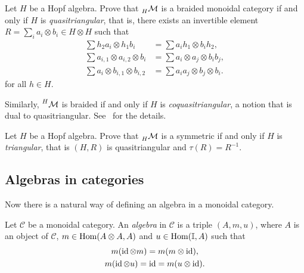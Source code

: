 \documentclass[12pt]{amsproc}
\newcommand{\ydH}{\prescript{H}{H}{\mathcal{YD}}}
\newcommand{\lmod}[1]{\prescript{}{#1}{\mathcal{M}}}
\newcommand{\lcomod}[1]{\prescript{#1}{}{\mathcal{M}}}
\begin{document}

\begin{exercise}
\label{xca:QT}
    Let $H$ be a Hopf algebra. Prove that 
    $\lmod{H}$ is a braided
    monoidal category if and only if $H$ is \emph{quasitriangular}, that is, there exists an invertible element
    $R=\sum_{i}a_{i}\otimes b_{i}\in H\otimes H$ such that 
\begin{align*}
\sum h_{2}a_{i}\otimes h_{1}b_{i} & =\sum a_{i}h_{1}\otimes b_{i}h_{2},\\
\sum a_{i,1}\otimes a_{i,2}\otimes b_{i} & =\sum a_{i}\otimes a_{j}\otimes b_{i}b_{j},\\
\sum a_{i}\otimes b_{i,1}\otimes b_{i,2} & =\sum a_{i}a_{j}\otimes b_{j}\otimes b_{i}.
\end{align*}
for all $h\in H$. 
\end{exercise} 

Similarly, $\lcomod{H}$ is braided if and only if $H$ is \emph{coquasitriangular}, a notion that is dual to quasitriangular. See~\cite[\S 10.2]{zbMATH00482792} for the details. 

\begin{exercise}
\label{xca:T}
Let $H$ be a Hopf algebra. Prove that 
    $\lmod{H}$ is a symmetric 
    if and only if $H$ is \emph{triangular}, that is 
    $(H,R)$ 
    is quasitriangular 
    and $\tau(R)=R^{-1}$. 
\end{exercise}

\subsection{Algebras in categories}
Now there is a natural way of defining an algebra in a monoidal category. 

\begin{definition}
Let $\mathcal{C}$ be a monoidal category. An \emph{algebra} in
$\mathcal{C}$ is a triple $(A,m,u)$, where $A$ is an object of
$\mathcal{C}$, $m\in\operatorname{Hom}(A\otimes A,A)$ and $u\in\operatorname{Hom}(\mathbb{I},A)$ such that 
\begin{gather*}
m(\operatorname{id}\otimes m)=m(m\otimes\operatorname{id}),\\
m(\operatorname{id}\otimes u)=\operatorname{id}=m(u\otimes\operatorname{id}).
\end{gather*}
\end{definition}
\end{document}

